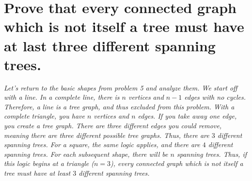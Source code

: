 \documentclass{article}
\begin{document}

\section{Prove that every connected graph which is not itself a tree must have at last three different spanning trees.}
\hspace{1cm}\textit{Let's return to the basic shapes from problem 5 and analyze them. We start off with a line. In a complete line, there is $n$ vertices and $n-1$ edges with no cycles. Therefore, a line is a tree graph, and thus excluded from this problem. With a complete triangle, you have $n$ vertices and $n$ edges. If you take away one edge, you create a tree graph. There are three different edges you could remove, meaning there are three different possible tree graphs. Thus, there are $3$ different spanning trees. For a square, the same logic applies, and there are $4$ different spanning trees. For each subsequent shape, there will be $n$ spanning trees. Thus, if this logic begins at a triangle ($n=3$), every connected graph which is not itself a tree must have at least $3$ different spanning trees.}
\end{document}

